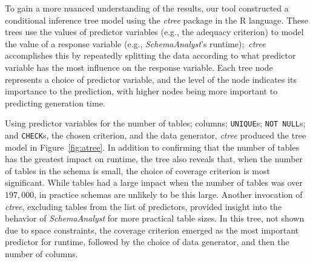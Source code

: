 
To gain a more nuanced understanding of the results, our tool constructed a conditional inference tree model using the
\textit{ctree} package in the R language. These trees use the values of predictor variables (e.g., the adequacy
criterion) to model the value of a response variable (e.g., {\em SchemaAnalyst}'s runtime);~\textit{ctree} accomplishes this
by repeatedly splitting the data according to what predictor variable has the most influence on the response variable.
Each tree node represents a choice of predictor variable, and the level of the node indicates its importance to
the prediction, with higher nodes being more important to predicting generation time.



Using predictor variables for the number of tables; columns; {\tt UNIQUE}s; {\tt NOT NULL}s; and {\tt CHECK}s, the chosen
criterion, and the data generator, \textit{ctree} produced the tree model in Figure~\ref{fig:atree}.  In addition to
confirming that the number of tables has the greatest impact on runtime, the tree also reveals that, when the number of
tables in the schema is small, the choice of coverage criterion is most significant.  While tables had a large impact
when the number of tables was over $197,000$, in practice schemas are unlikely to be this large. Another invocation of
\textit{ctree}, excluding tables from the list of predictors, provided insight into the behavior of
\textit{SchemaAnalyst} for more practical table sizes. In this tree, not shown due to space constraints, the coverage
criterion emerged as the most important predictor for runtime, followed by the choice of data generator, and then the
number of columns.
